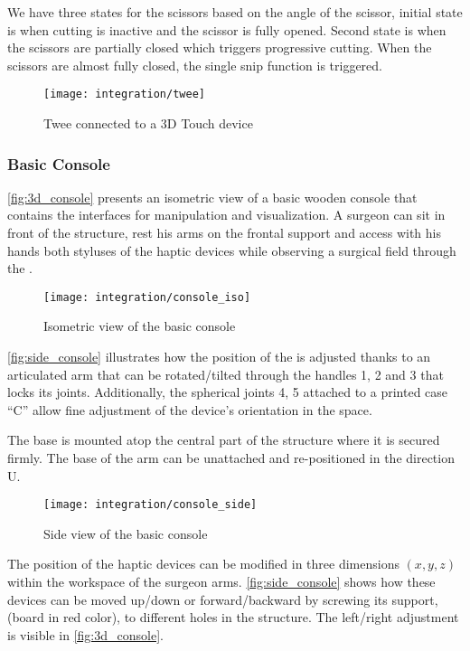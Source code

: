 We have three states for the scissors based on the angle of the scissor, initial state is when cutting is inactive and the scissor is fully opened. Second state is when the scissors are partially closed which triggers progressive cutting. When the scissors are almost fully closed, the single snip function is triggered.

\begin{figure}
  \centering
  \texttt{[image: integration/twee]}
  \caption{Twee connected to a 3D Touch device}\label{fig:twee}
\end{figure}

\subsubsection{Basic Console}
\autoref{fig:3d_console} presents an isometric view of a basic wooden console that contains the interfaces for manipulation and visualization. A surgeon can sit in front of the structure, rest his arms on the frontal support and access with his hands both styluses of the haptic devices while observing a surgical field through the .

\begin{figure}
  \centering%
  \texttt{[image: integration/console\_iso]}
  \caption{Isometric view of the basic console}\label{fig:3d_console}
\end{figure}

\autoref{fig:side_console} illustrates how the position of the  is adjusted thanks to an articulated arm that can be rotated/tilted through the handles 1, 2 and 3 that locks its joints. Additionally, the spherical joints 4, 5 attached to a  printed case \enquote{C} allow fine adjustment of the device's orientation in the space.

The base is mounted atop the central part of the structure where it is secured firmly. The base of the arm can be unattached and re-positioned in the direction U.

\begin{figure}
  \centering
  \texttt{[image: integration/console\_side]}
  \caption{Side view of the basic console}\label{fig:side_console}
\end{figure}

The position of the haptic devices can be modified in three dimensions $(x, y, z)$ within the workspace of the surgeon arms. \autoref{fig:side_console} shows how these devices can be moved up/down or forward/backward by screwing its support, (board in red color), to different holes in the structure. The left/right adjustment is visible in \autoref{fig:3d_console}.

